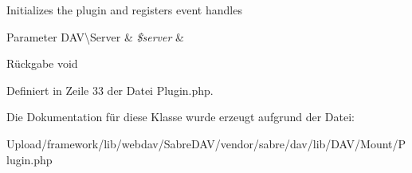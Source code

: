 Initializes the plugin and registers event handles


\begin{DoxyParams}[1]{Parameter}
D\+A\+V\textbackslash{}\+Server & {\em \$server} & \\
\hline
\end{DoxyParams}
\begin{DoxyReturn}{Rückgabe}
void 
\end{DoxyReturn}


Definiert in Zeile 33 der Datei Plugin.\+php.



Die Dokumentation für diese Klasse wurde erzeugt aufgrund der Datei\+:\begin{DoxyCompactItemize}
\item 
Upload/framework/lib/webdav/\+Sabre\+D\+A\+V/vendor/sabre/dav/lib/\+D\+A\+V/\+Mount/Plugin.\+php\end{DoxyCompactItemize}
